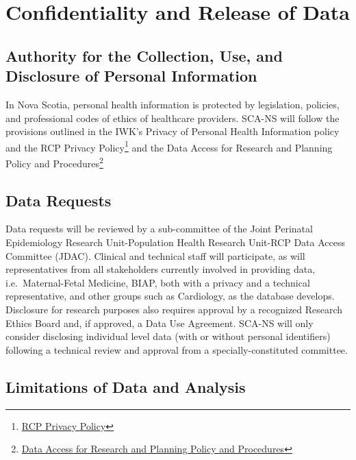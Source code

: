 \documentclass[
]{krantz}
\begin{document}
\hypertarget{section14}{%
\section{Confidentiality and Release of Data}\label{section14}}

\hypertarget{authority-for-the-collection-use-and-disclosure-of-personal-information}{%
\subsection*{Authority for the Collection, Use, and Disclosure of Personal Information}\label{authority-for-the-collection-use-and-disclosure-of-personal-information}}


In Nova Scotia, personal health information is protected by legislation, policies, and professional codes of ethics of healthcare providers. SCA-NS will follow the provisions outlined in the IWK's Privacy of Personal Health Information policy and the RCP Privacy Policy\footnote{ \href{http://rcp.nshealth.ca/about/privacy-personal-information}{RCP Privacy Policy}} and the Data Access for Research and Planning Policy and Procedures\footnote{ \href{https://rcp.nshealth.ca/sites/default/files/atlee-database/nsapd_data_access_policy_nov2007.pdf}{Data Access for Research and Planning Policy and Procedures}}

\hypertarget{data-requests}{%
\subsection*{Data Requests}\label{data-requests}}


Data requests will be reviewed by a sub-committee of the Joint Perinatal Epidemiology Research Unit-Population Health Research Unit-RCP Data Access Committee (JDAC). Clinical and technical staff will participate, as will representatives from all stakeholders currently involved in providing data, i.e.~Maternal-Fetal Medicine, BIAP, both with a privacy and a technical representative, and other groups such as Cardiology, as the database develops. Disclosure for research purposes also requires approval by a recognized Research Ethics Board and, if approved, a Data Use Agreement. SCA-NS will only consider disclosing individual level data (with or without personal identifiers) following a technical review and approval from a specially-constituted committee.

\hypertarget{limitations-of-data-and-analysis}{%
\subsection*{Limitations of Data and Analysis}\label{limitations-of-data-and-analysis}}
\end{document}
